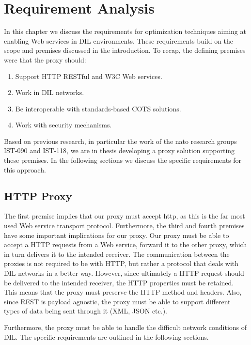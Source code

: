 \chapter{Requirement Analysis}
\label{chapter:requirements}

In this chapter we discuss the requirements for optimization techniques aiming
at enabling Web services in DIL environments. These requirements build on the
scope and premises discussed in the introduction. To recap, the defining
premises were that the proxy should:

\begin{enumerate}
    \item Support HTTP RESTful and W3C Web services.
    \item Work in DIL networks.
    \item Be interoperable with standards-based COTS solutions.
    \item Work with security mechanisms.
\end{enumerate}

Based on previous research, in particular the work of the \gls{nato} research
groups IST-090 and IST-118, we are in thesis developing a proxy solution
supporting these premises. In the following sections we discuss the specific
requirements for this approach.

\section{HTTP Proxy}

The first premise implies that our proxy must accept \gls{http}, as this is the
far most used Web service transport protocol. Furthermore, the third and fourth premises
have some important implications for our proxy. Our proxy must be able
to accept a HTTP requests from a Web service, forward it to the other proxy,
which in turn delivers it to the intended receiver. The communication between
the proxies is not required to be with HTTP, but rather a protocol that deals
with DIL networks in a better way. However, since ultimately a HTTP request
should be delivered to the intended receiver, the HTTP properties must be
retained. This means that the proxy must preserve the HTTP method and headers.
Also, since REST is payload agnostic, the proxy must be able to support
different types of data being sent through it (XML, JSON etc.).

Furthermore, the proxy must be able to handle the difficult network conditions
of DIL. The specific requirements are outlined in the following sections.

